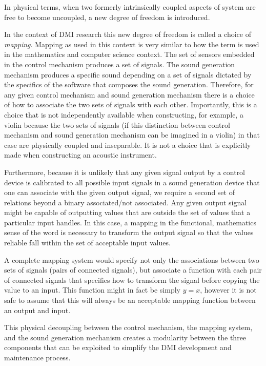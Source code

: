 In physical terms, when two formerly intrinsically coupled aspects of system are free to become uncoupled, a new degree of freedom is introduced.

In the context of DMI research this new degree of freedom is called a choice of \emph{mapping}. Mapping as used in this context is very similar to how the term is used in the mathematics and computer science context. The set of sensors embedded in the control mechanism produces a set of signals. The sound generation mechanism produces a specific sound depending on a set of signals dictated by the specifics of the software that composes the sound generation. Therefore, for any given control mechanism and sound generation mechanism there is a choice of how to associate the two sets of signals with each other. Importantly, this is a choice that is not independently available when constructing, for example, a violin because the two sets of signals (if this distinction between control mechanism and sound generation mechanism can be imagined in a violin) in that case are physically coupled and inseparable. It is not a choice that is explicitly made when constructing an acoustic instrument.

Furthermore, because it is unlikely that any given signal output by a control device is calibrated to all possible input signals in a sound generation device that one can associate with the given output signal, we require a second set of relations beyond a binary associated/not associated. Any given output signal might be capable of outputting values that are outside the set of values that a particular input handles. In this case, a mapping in the functional, mathematics sense of the word is necessary to transform the output signal so that the values reliable fall within the set of acceptable input values.

A complete mapping system would specify not only the associations between two sets of signals (pairs of connected signals), but associate a function with each pair of connected signals that specifies how to transform the signal before copying the value to an input. This function might in fact be simply \begin{math}y = x\end{math}, however it is not safe to assume that this will always be an acceptable mapping function between an output and input.

This physical decoupling between the control mechanism, the mapping system, and the sound generation mechanism creates a modularity between the three components that can be exploited to simplify the DMI development and maintenance process.

